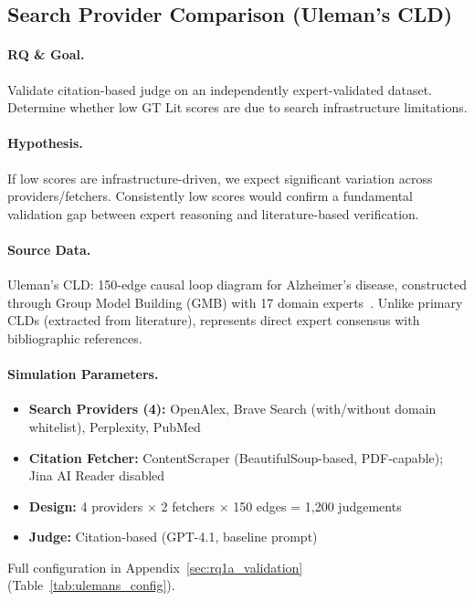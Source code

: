 \subsection{Search Provider Comparison (Uleman's CLD)}
\label{sec:ulemans_validation}

\paragraph{RQ \& Goal.}
Validate citation-based judge on an independently expert-validated dataset. Determine whether low GT Lit scores are due to search infrastructure limitations.

\paragraph{Hypothesis.}
If low scores are infrastructure-driven, we expect significant variation across providers/fetchers. Consistently low scores would confirm a fundamental validation gap between expert reasoning and literature-based verification.

\paragraph{Source Data.}
Uleman's CLD: 150-edge causal loop diagram for Alzheimer's disease, constructed through Group Model Building (GMB) with 17 domain experts~\cite{uleman2024triangulation}. Unlike primary CLDs (extracted from literature), represents direct expert consensus with bibliographic references.

\paragraph{Simulation Parameters.}
\begin{itemize}[noitemsep]
    \item \textbf{Search Providers (4):} OpenAlex, Brave Search (with/without domain whitelist), Perplexity, PubMed
    \item \textbf{Citation Fetcher:} ContentScraper (BeautifulSoup-based, PDF-capable); Jina AI Reader disabled
    \item \textbf{Design:} 4 providers $\times$ 2 fetchers $\times$ 150 edges = 1,200 judgements
    \item \textbf{Judge:} Citation-based (GPT-4.1, baseline prompt)
\end{itemize}
Full configuration in Appendix~\ref{sec:rq1a_validation} (Table~\ref{tab:ulemans_config}).

